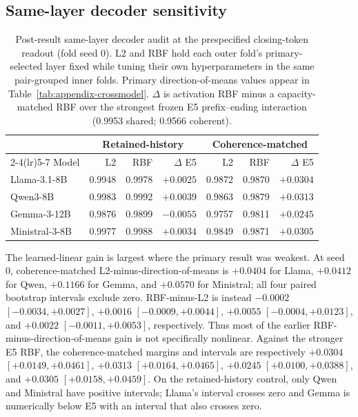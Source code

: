 \documentclass{article}
\begin{document}
\subsection{Same-layer decoder sensitivity}
\label{app:nonlinear-probe}

\begin{table}[h]
  \caption{Post-result same-layer decoder audit at the prespecified closing-token
  readout (fold seed 0). L2 and RBF hold each outer fold's primary-selected
  layer fixed while tuning their own hyperparameters in the same pair-grouped
  inner folds. Primary direction-of-means values appear in
  Table~\ref{tab:appendix-crossmodel}. $\Delta$ is activation RBF minus a
  capacity-matched RBF over the strongest frozen E5 prefix--ending interaction
  (0.9953 shared; 0.9566 coherent).}
  \label{tab:appendix-nonlinear}
  \centering
  \scriptsize
  \setlength{\tabcolsep}{2.5pt}
  \begin{tabular}{lrrr@{\qquad}rrr}
    \toprule
      & \multicolumn{3}{c}{Retained-history} & \multicolumn{3}{c}{Coherence-matched} \\
    \cmidrule(lr){2-4}\cmidrule(lr){5-7}
    Model & L2 & RBF & $\Delta$ E5 & L2 & RBF & $\Delta$ E5 \\
    \midrule
    Llama-3.1-8B & 0.9948 & 0.9978 & $+0.0025$ & 0.9872 & 0.9870 & $\mathbf{+0.0304}$ \\
    Qwen3-8B & 0.9983 & 0.9992 & $\mathbf{+0.0039}$ & 0.9863 & 0.9879 & $\mathbf{+0.0313}$ \\
    Gemma-3-12B & 0.9876 & 0.9899 & $-0.0055$ & 0.9757 & 0.9811 & $\mathbf{+0.0245}$ \\
    Ministral-3-8B & 0.9977 & 0.9988 & $\mathbf{+0.0034}$ & 0.9849 & 0.9871 & $\mathbf{+0.0305}$ \\
    \bottomrule
  \end{tabular}
\end{table}

The learned-linear gain is largest where the primary result was weakest. At
seed 0, coherence-matched L2-minus-direction-of-means is $+0.0404$ for Llama,
$+0.0412$ for Qwen, $+0.1166$ for Gemma, and $+0.0570$ for Ministral; all four
paired bootstrap intervals exclude zero. RBF-minus-L2 is instead $-0.0002$
$[-0.0034,+0.0027]$, $+0.0016$ $[-0.0009,+0.0044]$, $+0.0055$
$[-0.0004,+0.0123]$, and $+0.0022$ $[-0.0011,+0.0053]$, respectively. Thus
most of the earlier RBF-minus-direction-of-means gain is not specifically
nonlinear. Against the stronger E5 RBF, the coherence-matched margins and intervals
are respectively $+0.0304$ $[+0.0149,+0.0461]$, $+0.0313$
$[+0.0164,+0.0465]$, $+0.0245$ $[+0.0100,+0.0388]$, and $+0.0305$
$[+0.0158,+0.0459]$. On the retained-history control, only Qwen and Ministral have positive
intervals; Llama's interval crosses zero and Gemma is numerically below E5 with
an interval that also crosses zero.
\end{document}
